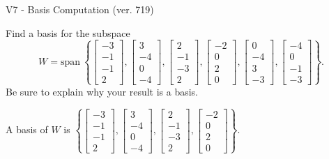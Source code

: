 \begin{exercise}
  \begin{exerciseTitle}V7 - Basis Computation (ver. 719)\end{exerciseTitle}
  \begin{exerciseStatement}
    Find a basis for the subspace 
\[W=\mathrm{span}\ \left\{\left[\begin{array}{r}
-3 \\
-1 \\
-1 \\
2
\end{array}\right] , \left[\begin{array}{r}
3 \\
-4 \\
0 \\
-4
\end{array}\right] , \left[\begin{array}{r}
2 \\
-1 \\
-3 \\
2
\end{array}\right] , \left[\begin{array}{r}
-2 \\
0 \\
2 \\
0
\end{array}\right] , \left[\begin{array}{r}
0 \\
-4 \\
3 \\
-3
\end{array}\right] , \left[\begin{array}{r}
-4 \\
0 \\
-1 \\
-3
\end{array}\right]\right\}.\]
 Be sure to explain why your result is a basis.


  \end{exerciseStatement}
  \begin{exerciseAnswer}
   A basis of \(W\) is  \(\left\{\left[\begin{array}{r}
-3 \\
-1 \\
-1 \\
2
\end{array}\right] , \left[\begin{array}{r}
3 \\
-4 \\
0 \\
-4
\end{array}\right] , \left[\begin{array}{r}
2 \\
-1 \\
-3 \\
2
\end{array}\right] , \left[\begin{array}{r}
-2 \\
0 \\
2 \\
0
\end{array}\right]\right\}\).
  


  \end{exerciseAnswer}
\end{exercise}